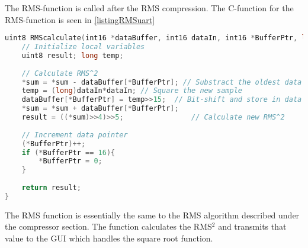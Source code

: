 The RMS-function is called after the RMS compression. The C-function for the RMS-function is seen in \autoref{listingRMSuart}

\begin{lstlisting}[language=C, caption = {Calculate RMS value},label={listingRMSuart}]
uint8 RMScalculate(int16 *dataBuffer, int16 dataIn, int16 *BufferPtr, long *sum){
	// Initialize local variables
	uint8 result; long temp;
	
	// Calculate RMS^2
	*sum = *sum - dataBuffer[*BufferPtr]; // Substract the oldest data from sum
	temp = (long)dataIn*dataIn;	// Square the new sample
	dataBuffer[*BufferPtr] = temp>>15;	// Bit-shift and store in data buffer
	*sum = *sum + dataBuffer[*BufferPtr];
	result = ((*sum)>>4)>>5;				// Calculate new RMS^2
	
	// Increment data pointer
	(*BufferPtr)++;
	if (*BufferPtr == 16){ 
		*BufferPtr = 0;
	}
	
	return result;
}
\end{lstlisting}

The RMS function is essentially the same to the RMS algorithm described under the compressor section. The function calculates the RMS$^2$ and transmits that value to the GUI which handles the square root function.



